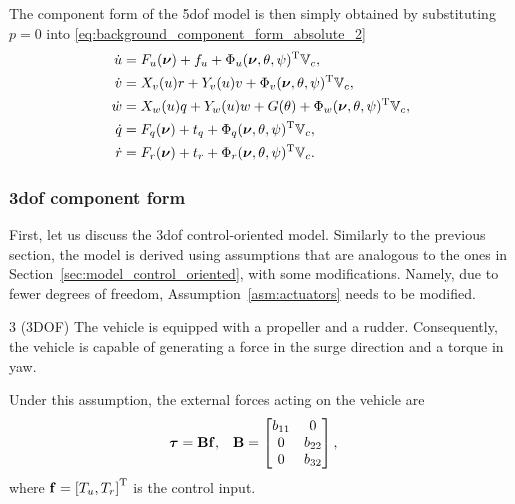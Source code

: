 The component form of the 5\gls{dof} model is then simply obtained by substituting $p = 0$ into \eqref{eq:background_component_form_absolute_2}
\begin{subequations}
    \begin{align}
        \dot{u} &= F_u(\bm{\nu}) + f_u + \Phi_u(\bm{\nu}, \theta, \psi)^{\mathrm{T}}\mathbb{V}_c, \\
        \dot{v} &= X_v(u)r + Y_v(u)v + \Phi_v(\bm{\nu}, \theta, \psi)^{\mathrm{T}}\mathbb{V}_c, \\
        \dot{w} &= X_w(u)q + Y_w(u)w + G(\theta) + \Phi_w(\bm{\nu}, \theta, \psi)^{\mathrm{T}}\mathbb{V}_c, \\
        \dot{q} &= F_q(\bm{\nu}) + t_q + \Phi_q(\bm{\nu}, \theta, \psi)^{\mathrm{T}}\mathbb{V}_c, \\
        \dot{r} &= F_r(\bm{\nu}) + t_r + \Phi_r(\bm{\nu}, \theta, \psi)^{\mathrm{T}}\mathbb{V}_c.
    \end{align}
    \label{eq:background_component_form_5DOF}
\end{subequations}

\subsubsection{3\gls{dof} component form}
First, let us discuss the 3\gls{dof} control-oriented model.
Similarly to the previous section, the model is derived using assumptions that are analogous to the ones in Section~\ref{sec:model_control_oriented}, with some modifications.
Namely, due to fewer degrees of freedom, Assumption~\ref{asm:actuators} needs to be modified.

\begin{customasm}{3 (3DOF)}
    \label{asm:actuators_3DOF}
    The vehicle is equipped with a propeller and a rudder.
    Consequently, the vehicle is capable of generating a force in the surge direction and a torque in yaw.
\end{customasm}

Under this assumption, the external forces acting on the vehicle are
\begin{align}
    \bm{\tau} &= \mathbf{B}\mathbf{f}, &
    \mathbf{B} &= 
    \begin{bmatrix}
        b_{11} & 0 \\ 0 & b_{22} \\ 0 & b_{32}
    \end{bmatrix},
\end{align}
where $\mathbf{f} = \left[T_u, T_r\right]^{\mathrm{T}}$ is the control input.

